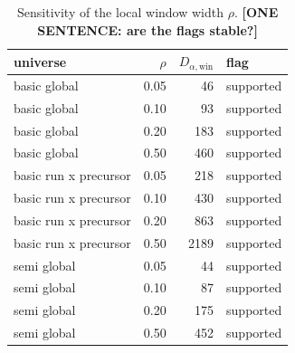 \begin{table}[htbp]\centering
\caption{Sensitivity of the local window width $\rho$. \textbf{[ONE SENTENCE:
are the flags stable?]}}
\label{tab:rho_sens}\small
\begin{tabular}{lrrl}\toprule
universe & $\rho$ & $D_{\alpha,\mathrm{win}}$ & flag \\ \midrule
basic global & 0.05 & 46 & supported \\
basic global & 0.10 & 93 & supported \\
basic global & 0.20 & 183 & supported \\
basic global & 0.50 & 460 & supported \\
basic run x precursor & 0.05 & 218 & supported \\
basic run x precursor & 0.10 & 430 & supported \\
basic run x precursor & 0.20 & 863 & supported \\
basic run x precursor & 0.50 & 2189 & supported \\
semi global & 0.05 & 44 & supported \\
semi global & 0.10 & 87 & supported \\
semi global & 0.20 & 175 & supported \\
semi global & 0.50 & 452 & supported \\
\bottomrule\end{tabular}\end{table}

